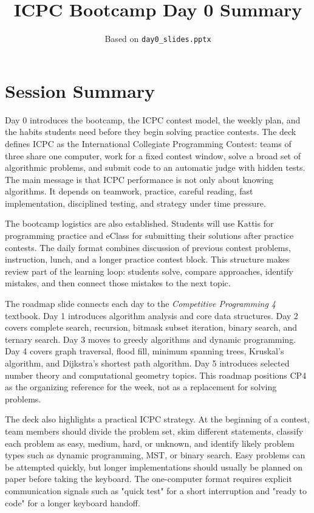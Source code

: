 \documentclass[11pt]{article}
\title{ICPC Bootcamp Day 0 Summary}
\author{Based on \texttt{day0\_slides.pptx}}
\date{}
\begin{document}
\maketitle

\section*{Session Summary}
Day 0 introduces the bootcamp, the ICPC contest model, the weekly plan, and the habits students need before they begin solving practice contests. The deck defines ICPC as the International Collegiate Programming Contest: teams of three share one computer, work for a fixed contest window, solve a broad set of algorithmic problems, and submit code to an automatic judge with hidden tests. The main message is that ICPC performance is not only about knowing algorithms. It depends on teamwork, practice, careful reading, fast implementation, disciplined testing, and strategy under time pressure.

The bootcamp logistics are also established. Students will use Kattis for programming practice and eClass for submitting their solutions after practice contests. The daily format combines discussion of previous contest problems, instruction, lunch, and a longer practice contest block. This structure makes review part of the learning loop: students solve, compare approaches, identify mistakes, and then connect those mistakes to the next topic.

The roadmap slide connects each day to the \textit{Competitive Programming 4} textbook. Day 1 introduces algorithm analysis and core data structures. Day 2 covers complete search, recursion, bitmask subset iteration, binary search, and ternary search. Day 3 moves to greedy algorithms and dynamic programming. Day 4 covers graph traversal, flood fill, minimum spanning trees, Kruskal's algorithm, and Dijkstra's shortest path algorithm. Day 5 introduces selected number theory and computational geometry topics. This roadmap positions CP4 as the organizing reference for the week, not as a replacement for solving problems.

The deck also highlights a practical ICPC strategy. At the beginning of a contest, team members should divide the problem set, skim different statements, classify each problem as easy, medium, hard, or unknown, and identify likely problem types such as dynamic programming, MST, or binary search. Easy problems can be attempted quickly, but longer implementations should usually be planned on paper before taking the keyboard. The one-computer format requires explicit communication signals such as "quick test" for a short interruption and "ready to code" for a longer keyboard handoff.
\end{document}
